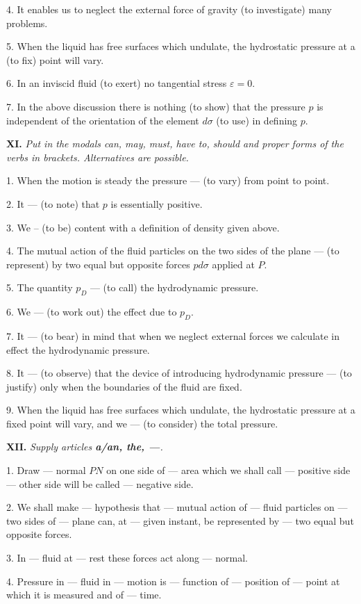 \documentclass[a4paper]{article}
\newcommand{\ETask}[2]{\medskip\par\textbf{#1.} \textit{#2}\par}
\begin{document}
4. It enables us to neglect the external force of gravity (to investigate) many problems.

5. When the liquid has free surfaces which undulate, the hydrostatic pressure at a (to fix) point will vary.

6. In an inviscid fluid (to exert) no tangential stress $\varepsilon = 0$.

7. In the above discussion there is nothing (to show) that the pressure $p$ is independent of the orientation of the element
$d \sigma$ (to use) in defining $p$.

\ETask{XI}{Put in the modals can, may, must, have to, should and proper forms of the verbs in brackets. Alternatives are possible.}
1. When the motion is steady the pressure --- (to vary) from point to point.

2. It --- (to note) that $p$ is essentially positive.

3. We -- (to be) content with a definition of density given above.

4. The mutual action of the fluid particles on the two sides of the plane --- (to represent) by two equal but opposite forces
$p d \sigma$ applied at $P$.

5. The quantity $p_D$ --- (to call) the hydrodynamic pressure.

6. We --- (to work out) the effect due to $p_D$.

7. It --- (to bear) in mind that when we neglect external forces we calculate in effect the hydrodynamic pressure.

8. It --- (to observe) that the device of introducing hydrodynamic pressure --- (to justify) only when the boundaries of the
fluid are fixed.

9. When the liquid has free surfaces which undulate, the hydrostatic pressure at a fixed point will vary, and we --- (to
consider) the total pressure.

\ETask{XII}{Supply articles \textbf{a/an, the, ---}.}

1. Draw --- normal $PN$ on one side of --- area which we shall call --- positive side --- other side will be called ---
negative side.

2. We shall make --- hypothesis that --- mutual action of --- fluid particles on --- two sides of --- plane can, at --- given
instant, be represented by --- two equal but opposite forces.

3. In --- fluid at --- rest these forces act along --- normal.

4. Pressure in --- fluid in --- motion is --- function of --- position of --- point at which it is measured and of --- time.
\end{document}
